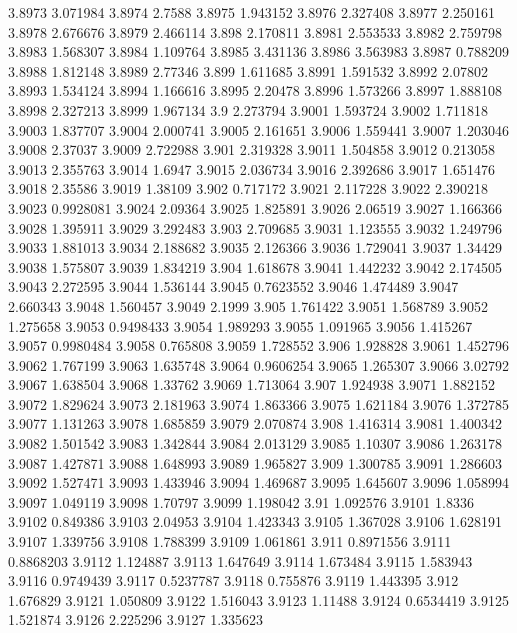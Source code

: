 3.8973  3.071984
3.8974  2.7588
3.8975  1.943152
3.8976  2.327408
3.8977  2.250161
3.8978  2.676676
3.8979  2.466114
3.898  2.170811
3.8981  2.553533
3.8982  2.759798
3.8983  1.568307
3.8984  1.109764
3.8985  3.431136
3.8986  3.563983
3.8987  0.788209
3.8988  1.812148
3.8989  2.77346
3.899  1.611685
3.8991  1.591532
3.8992  2.07802
3.8993  1.534124
3.8994  1.166616
3.8995  2.20478
3.8996  1.573266
3.8997  1.888108
3.8998  2.327213
3.8999  1.967134
3.9  2.273794
3.9001  1.593724
3.9002  1.711818
3.9003  1.837707
3.9004  2.000741
3.9005  2.161651
3.9006  1.559441
3.9007  1.203046
3.9008  2.37037
3.9009  2.722988
3.901  2.319328
3.9011  1.504858
3.9012  0.213058
3.9013  2.355763
3.9014  1.6947
3.9015  2.036734
3.9016  2.392686
3.9017  1.651476
3.9018  2.35586
3.9019  1.38109
3.902  0.717172
3.9021  2.117228
3.9022  2.390218
3.9023  0.9928081
3.9024  2.09364
3.9025  1.825891
3.9026  2.06519
3.9027  1.166366
3.9028  1.395911
3.9029  3.292483
3.903  2.709685
3.9031  1.123555
3.9032  1.249796
3.9033  1.881013
3.9034  2.188682
3.9035  2.126366
3.9036  1.729041
3.9037  1.34429
3.9038  1.575807
3.9039  1.834219
3.904  1.618678
3.9041  1.442232
3.9042  2.174505
3.9043  2.272595
3.9044  1.536144
3.9045  0.7623552
3.9046  1.474489
3.9047  2.660343
3.9048  1.560457
3.9049  2.1999
3.905  1.761422
3.9051  1.568789
3.9052  1.275658
3.9053  0.9498433
3.9054  1.989293
3.9055  1.091965
3.9056  1.415267
3.9057  0.9980484
3.9058  0.765808
3.9059  1.728552
3.906  1.928828
3.9061  1.452796
3.9062  1.767199
3.9063  1.635748
3.9064  0.9606254
3.9065  1.265307
3.9066  3.02792
3.9067  1.638504
3.9068  1.33762
3.9069  1.713064
3.907  1.924938
3.9071  1.882152
3.9072  1.829624
3.9073  2.181963
3.9074  1.863366
3.9075  1.621184
3.9076  1.372785
3.9077  1.131263
3.9078  1.685859
3.9079  2.070874
3.908  1.416314
3.9081  1.400342
3.9082  1.501542
3.9083  1.342844
3.9084  2.013129
3.9085  1.10307
3.9086  1.263178
3.9087  1.427871
3.9088  1.648993
3.9089  1.965827
3.909  1.300785
3.9091  1.286603
3.9092  1.527471
3.9093  1.433946
3.9094  1.469687
3.9095  1.645607
3.9096  1.058994
3.9097  1.049119
3.9098  1.70797
3.9099  1.198042
3.91  1.092576
3.9101  1.8336
3.9102  0.849386
3.9103  2.04953
3.9104  1.423343
3.9105  1.367028
3.9106  1.628191
3.9107  1.339756
3.9108  1.788399
3.9109  1.061861
3.911  0.8971556
3.9111  0.8868203
3.9112  1.124887
3.9113  1.647649
3.9114  1.673484
3.9115  1.583943
3.9116  0.9749439
3.9117  0.5237787
3.9118  0.755876
3.9119  1.443395
3.912  1.676829
3.9121  1.050809
3.9122  1.516043
3.9123  1.11488
3.9124  0.6534419
3.9125  1.521874
3.9126  2.225296
3.9127  1.335623

